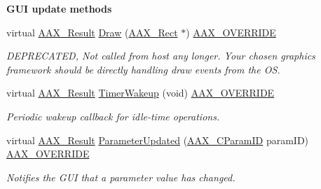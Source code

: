 \begin{Indent}{\bf G\+U\+I update methods}\par
\begin{DoxyCompactItemize}
\item 
virtual \hyperlink{a00149_a4d8f69a697df7f70c3a8e9b8ee130d2f}{A\+A\+X\+\_\+\+Result} \hyperlink{a00017_a377d640870ce2452fc527cb50f7ce433}{Draw} (\hyperlink{a00120}{A\+A\+X\+\_\+\+Rect} $\ast$) \hyperlink{a00149_ac2f24a5172689ae684344abdcce55463}{A\+A\+X\+\_\+\+O\+V\+E\+R\+R\+I\+D\+E}
\begin{DoxyCompactList}\small\item\em D\+E\+P\+R\+E\+C\+A\+T\+E\+D, Not called from host any longer. Your chosen graphics framework should be directly handling draw events from the O\+S. \end{DoxyCompactList}\item 
virtual \hyperlink{a00149_a4d8f69a697df7f70c3a8e9b8ee130d2f}{A\+A\+X\+\_\+\+Result} \hyperlink{a00017_a2186a7fce37eeaf4cc9cc882396539c5}{Timer\+Wakeup} (void) \hyperlink{a00149_ac2f24a5172689ae684344abdcce55463}{A\+A\+X\+\_\+\+O\+V\+E\+R\+R\+I\+D\+E}
\begin{DoxyCompactList}\small\item\em Periodic wakeup callback for idle-\/time operations. \end{DoxyCompactList}\item 
virtual \hyperlink{a00149_a4d8f69a697df7f70c3a8e9b8ee130d2f}{A\+A\+X\+\_\+\+Result} \hyperlink{a00017_ae7ef718dfb02bf695dfe378ca6990cae}{Parameter\+Updated} (\hyperlink{a00149_a1440c756fe5cb158b78193b2fc1780d1}{A\+A\+X\+\_\+\+C\+Param\+I\+D} param\+I\+D) \hyperlink{a00149_ac2f24a5172689ae684344abdcce55463}{A\+A\+X\+\_\+\+O\+V\+E\+R\+R\+I\+D\+E}
\begin{DoxyCompactList}\small\item\em Notifies the G\+U\+I that a parameter value has changed. \end{DoxyCompactList}\end{DoxyCompactItemize}
\end{Indent}
